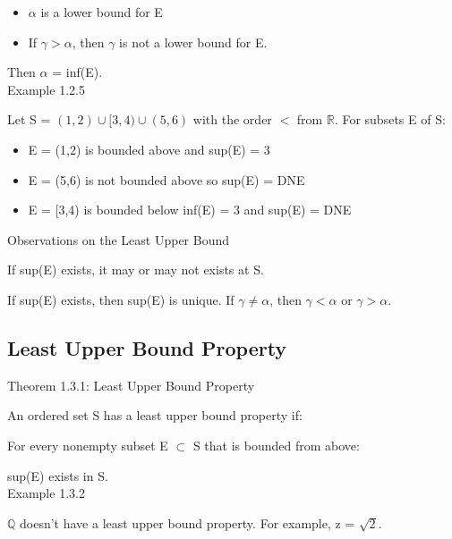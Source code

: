 	\begin{itemize}[leftmargin=2cm , itemsep=0.1cm]
		\item $\alpha$ is a lower bound for E

		\item If $\gamma > \alpha$, then $\gamma$ is not a lower bound for E.
	\end{itemize}

	\qquad \qquad Then $\alpha$ = inf(E). \\

{ \color{purple} Example 1.2.5 }

	\qquad Let S = $ (1,2) \cup [3,4) \cup (5,6) $ with the order $ < $ from $ \mathbb{R} $.
	For subsets E of S:

	\begin{itemize}[leftmargin=2cm, itemsep=0.1cm]
		\item E = (1,2) is bounded above and sup(E) = 3
	
		\item E = (5,6) is not bounded above so sup(E) = DNE
	
		\item E = [3,4) is bounded below inf(E) = 3 and sup(E) = DNE \\
	\end{itemize}

{ \color{blue} Observations on the Least Upper Bound }

	\qquad If sup(E) exists, it may or may not exists at S.

	\qquad If sup(E)  exists, then sup(E) is unique.
	If $ \gamma \neq \alpha $, then $ \gamma < \alpha $ or $ \gamma > \alpha $.




	
\subsection{Least Upper Bound Property}

{ \color{red} Theorem 1.3.1: Least Upper Bound Property }

	\qquad An ordered set S has a least upper bound property if:

	\qquad \qquad For every nonempty subset E $ \subset $ S that is bounded from above:

	\qquad \qquad \qquad sup(E) exists in S. \\

{ \color{purple} Example 1.3.2 }

	\qquad $ \mathbb{Q} $ doesn't have a least upper bound property. For example, z = $ \sqrt{2} $.

